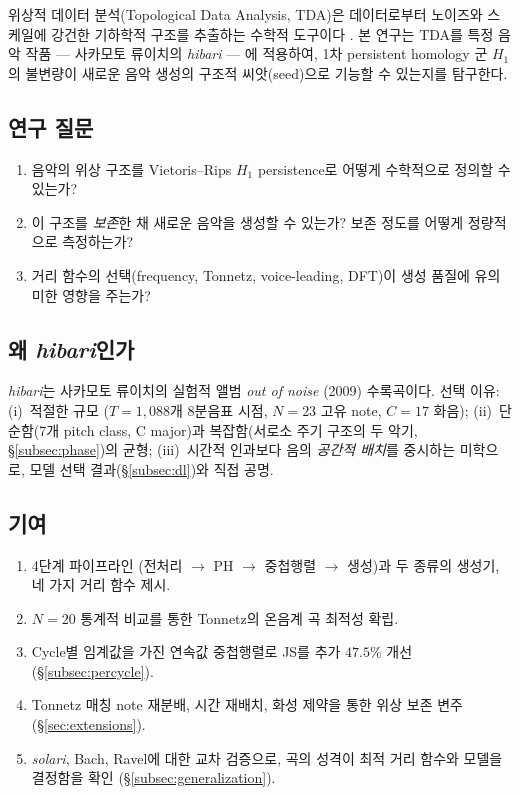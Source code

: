 \documentclass[conference,10pt,a4paper]{IEEEtran}
\begin{document}
위상적 데이터 분석(Topological Data Analysis, TDA)은 데이터로부터
노이즈와 스케일에 강건한 기하학적 구조를 추출하는 수학적 도구이다
\cite{carlsson2009,edelsbrunner2010}.
본 연구는 TDA를 특정 음악 작품 --- 사카모토 류이치의 \emph{hibari}
--- 에 적용하여, 1차 persistent homology 군 $H_1$의 불변량이
새로운 음악 생성의 구조적 씨앗(seed)으로 기능할 수 있는지를 탐구한다.

\subsection{연구 질문}
\begin{enumerate}
\item 음악의 위상 구조를 Vietoris--Rips $H_1$ persistence로
      어떻게 수학적으로 정의할 수 있는가?
\item 이 구조를 \emph{보존}한 채 새로운 음악을 생성할 수 있는가?
      보존 정도를 어떻게 정량적으로 측정하는가?
\item 거리 함수의 선택(frequency, Tonnetz, voice-leading, DFT)이
      생성 품질에 유의미한 영향을 주는가?
\end{enumerate}

\subsection{왜 \emph{hibari}인가}
\emph{hibari}는 사카모토 류이치의 실험적 앨범
\emph{out of noise} (2009) 수록곡이다. 선택 이유:
(i)~적절한 규모 ($T = 1{,}088$개 8분음표 시점, $N = 23$ 고유 note,
$C = 17$ 화음);
(ii)~단순함(7개 pitch class, C major)과 복잡함(서로소 주기 구조의
두 악기, \S\ref{subsec:phase})의 균형;
(iii)~시간적 인과보다 음의 \emph{공간적 배치}를 중시하는 미학으로,
모델 선택 결과(\S\ref{subsec:dl})와 직접 공명.

\subsection{기여}
\begin{enumerate}
\item 4단계 파이프라인 (전처리 $\to$ PH $\to$ 중첩행렬
      $\to$ 생성)과 두 종류의 생성기, 네 가지 거리 함수 제시.
\item $N=20$ 통계적 비교를 통한 Tonnetz의 온음계 곡 최적성 확립.
\item Cycle별 임계값을 가진 연속값 중첩행렬로 JS를 추가
      $47.5\%$ 개선 (\S\ref{subsec:percycle}).
\item Tonnetz 매칭 note 재분배, 시간 재배치, 화성 제약을 통한
      위상 보존 변주 (\S\ref{sec:extensions}).
\item \emph{solari}, Bach, Ravel에 대한 교차 검증으로,
      곡의 성격이 최적 거리 함수와 모델을 결정함을 확인
      (\S\ref{subsec:generalization}).
\end{enumerate}
\end{document}
